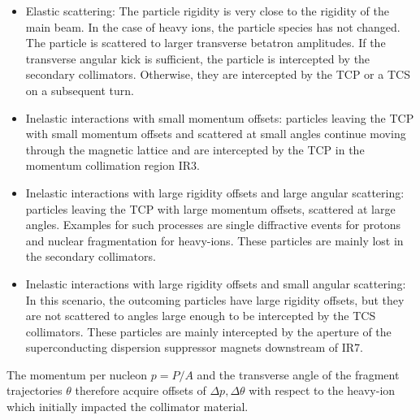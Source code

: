 \begin{itemize}
   \item Elastic scattering: The particle rigidity is very close to the rigidity of the main beam. In the case of heavy ions, the particle species has not changed. The particle is scattered to larger transverse betatron amplitudes. If the transverse angular kick is sufficient, the particle is intercepted by the secondary collimators. Otherwise, they are intercepted by the TCP or a TCS on a subsequent turn.
   \item Inelastic interactions with small momentum offsets: particles leaving the TCP with small momentum offsets and scattered at small angles continue moving through the magnetic lattice and are intercepted by the TCP in the momentum collimation region IR3.
   \item Inelastic interactions with large rigidity offsets and large angular scattering: particles leaving the TCP with large momentum offsets, scattered at large angles. Examples for such processes are single diffractive events for protons and nuclear fragmentation for heavy-ions. These particles are mainly lost in the secondary collimators. 
   \item Inelastic interactions with large rigidity offsets and small angular scattering:  In this scenario, the outcoming particles have large rigidity offsets, but they are not scattered to angles large enough to be intercepted by the TCS collimators. These particles are mainly intercepted by the aperture of the superconducting dispersion suppressor magnets downstream of IR7. 
\end{itemize}






The momentum per nucleon $p=P/A$ and the transverse angle of the fragment trajectories $\theta$ therefore acquire offsets of $\Delta p,\Delta \theta$ with respect to the heavy-ion which initially impacted the collimator material.



